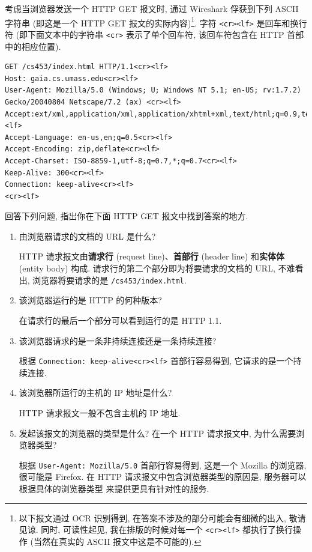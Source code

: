 \documentclass[10pt,UTF8]{ctexbook} %
\begin{document}
\begin{example}
    考虑当浏览器发送一个 HTTP GET 报文时, 通过 Wireshark 俘获到下列 ASCII 字符串
    (即这是一个 HTTP GET 报文的实际内容)\footnote{
        以下报文通过 OCR 识别得到, 在答案不涉及的部分可能会有细微的出入, 敬请见谅.
        同时, 可读性起见, 我在排版的时候对每一个 \lstinline|<cr><lf>| 都执行了换行操作
        (当然在真实的 ASCII 报文中这是不可能的).
    }. 字符 \lstinline|<cr><lf>| 是回车和换行符
    (即下面文本中的字符串 \lstinline|<cr>| 表示了单个回车符, 该回车符包含在 HTTP 首部
    中的相应位置). 
    \begin{lstlisting}
GET /cs453/index.html HTTP/1.1<cr><lf>
Host: gaia.cs.umass.edu<cr><lf>
User-Agent: Mozilla/5.0 (Windows; U; Windows NT 5.1; en-US; rv:1.7.2) Gecko/20040804 Netscape/7.2 (ax) <cr><lf>
Accept:ext/xml,application/xml,application/xhtml+xml,text/html;q=0.9,text/plain;q=0.8,image/png,*/*;q=0.5<cr><lf>  
Accept-Language: en-us,en;q=0.5<cr><lf>
Accept-Encoding: zip,deflate<cr><lf>
Accept-Charset: ISO-8859-1,utf-8;q=0.7,*;q=0.7<cr><lf>
Keep-Alive: 300<cr><lf>
Connection: keep-alive<cr><lf>
<cr><lf>
    \end{lstlisting}
    回答下列问题, 指出你在下面 HTTP GET 报文中找到答案的地方.
    \begin{enumerate}[label={\alph*.}, itemsep=0pt]
        \item 由浏览器请求的文档的 URL 是什么?
        
        HTTP 请求报文由\textbf{请求行} (request line)、\textbf{首部行} (header line)
        和\textbf{实体体} (entity body) 构成. 请求行的第二个部分即为将要请求的文档的 URL,
        不难看出, 浏览器将要请求的是 \lstinline|/cs453/index.html|.
        \item 该浏览器运行的是 HTTP 的何种版本?

        在请求行的最后一个部分可以看到运行的是 HTTP 1.1.
        \item 该浏览器请求的是一条非持续连接还是一条持续连接?

        根据 \lstinline|Connection: keep-alive<cr><lf>| 首部行容易得到,
        它请求的是一个持续连接.
        \item 该浏览器所运行的主机的 IP 地址是什么?

        HTTP 请求报文一般不包含主机的 IP 地址.

        \item 发起该报文的浏览器的类型是什么? 在一个 HTTP 请求报文中, 为什么需要浏览器类型?
        
        根据 \lstinline|User-Agent: Mozilla/5.0| 首部行容易得到, 这是一个 Mozilla 的浏览器,
        很可能是 Firefox. 在 HTTP 请求报文中包含浏览器类型的原因是, 服务器可以根据具体的浏览器类型
        来提供更具有针对性的服务.
    \end{enumerate}
\end{example}
\end{document}
